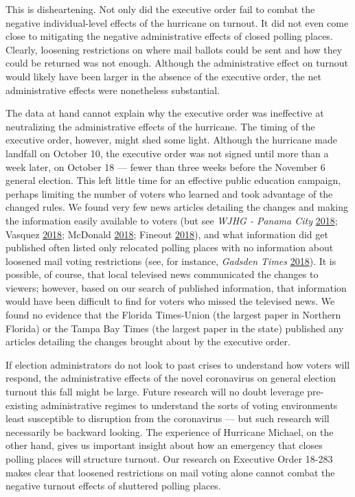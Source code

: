 \documentclass[
  12pt,
]{article}
\begin{document}
This is disheartening. Not only did the executive order fail to combat the negative individual-level effects of the hurricane on turnout. It did not even come close to mitigating the negative administrative effects of closed polling places. Clearly, loosening restrictions on where mail ballots could be sent and how they could be returned was not enough. Although the administrative effect on turnout would likely have been larger in the absence of the executive order, the net administrative effects were nonetheless substantial.

The data at hand cannot explain why the executive order was ineffective at neutralizing the administrative effects of the hurricane. The timing of the executive order, however, might shed some light. Although the hurricane made landfall on October 10, the executive order was not signed until more than a week later, on October 18 --- fewer than three weeks before the November 6 general election. This left little time for an effective public education campaign, perhaps limiting the number of voters who learned and took advantage of the changed rules. We found very few news articles detailing the changes and making the information easily available to voters (but see \emph{WJHG - Panama City} \protect\hyperlink{ref-WJHG2018}{2018}; Vasquez \protect\hyperlink{ref-Vasquez2018}{2018}; McDonald \protect\hyperlink{ref-McDonald2018}{2018}; Fineout \protect\hyperlink{ref-Fineout2018}{2018}), and what information did get published often listed only relocated polling places with no information about loosened mail voting restrictions (see, for instance, \emph{Gadsden Times} \protect\hyperlink{ref-gadsdentimes2018}{2018}). It is possible, of course, that local televised news communicated the changes to viewers; however, based on our search of published information, that information would have been difficult to find for voters who missed the televised news. We found no evidence that the Florida Times-Union (the largest paper in Northern Florida) or the Tampa Bay Times (the largest paper in the state) published any articles detailing the changes brought about by the executive order.

If election administrators do not look to past crises to understand how voters will respond, the administrative effects of the novel coronavirus on general election turnout this fall might be large. Future research will no doubt leverage pre-existing administrative regimes to understand the sorts of voting environments least susceptible to disruption from the coronavirus --- but such research will necessarily be backward looking. The experience of Hurricane Michael, on the other hand, gives us important insight about how an emergency that closes polling places will structure turnout. Our research on Executive Order 18-283 makes clear that loosened restrictions on mail voting alone cannot combat the negative turnout effects of shuttered polling places.
\end{document}
